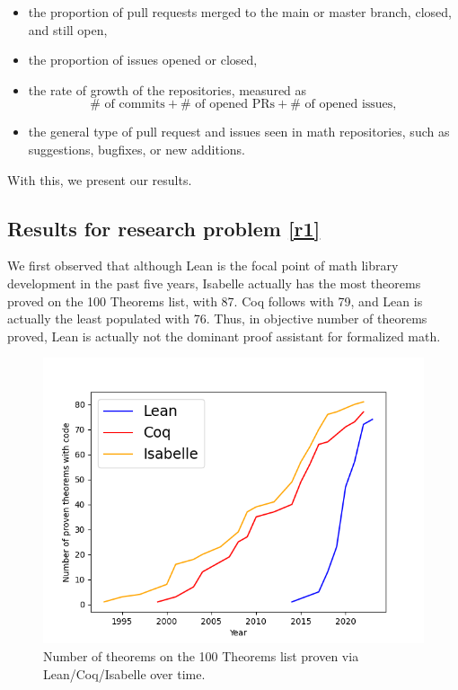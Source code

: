 \documentclass[sigconf,nonacm]{acmart}
\begin{document}
\begin{itemize}
 \item the proportion of pull requests merged to the main or master branch, closed, and still open,
 \item the proportion of issues opened or closed,
 \item the rate of growth of the repositories, measured as
 \begin{equation}\label{eq1}
   \#\text{ of commits}+\#\text{ of opened PRs}+\#\text{ of opened issues},
 \end{equation}
 \item the general type of pull request and issues seen in math repositories, such as suggestions, bugfixes, or new additions.
\end{itemize}

With this, we present our results.

\subsection{Results for research problem \ref{r1}}

We first observed that although Lean is the focal point of math library development in the past five years, Isabelle actually has the most theorems proved on the 100 Theorems list, with 87. Coq follows with 79, and Lean is actually the least populated with 76. Thus, in objective number of theorems proved, Lean is actually not the dominant proof assistant for formalized math. 

\begin{figure}[H]
  \includegraphics[scale=0.5]{thm_dev.png}
  \caption{Number of theorems on the 100 Theorems list proven via Lean/Coq/Isabelle over time.}
  \label{thms over time}
\end{figure}
\end{document}
